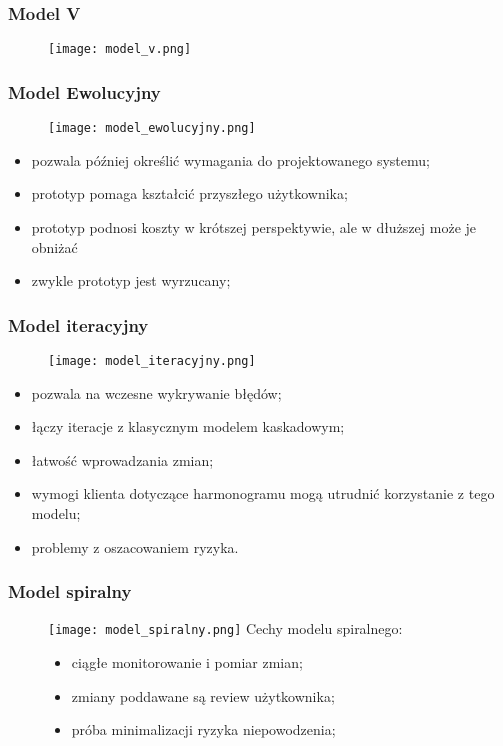 \documentclass[a4paper]{article}
\begin{document}
\subsubsection{Model V}
\begin{figure}[!h]
    \texttt{[image: model\_v.png]}
\end{figure}

\subsubsection{Model Ewolucyjny}
\begin{figure}[!h]
    \texttt{[image: model\_ewolucyjny.png]}
\end{figure}
    \begin{itemize}
        \item pozwala później określić wymagania do projektowanego
systemu;
        \item prototyp pomaga kształcić przyszłego użytkownika;
        \item prototyp podnosi koszty w krótszej perspektywie, ale w
dłuższej może je obniżać
        \item zwykle prototyp jest wyrzucany;
    \end{itemize}

\subsubsection{Model iteracyjny}
\begin{figure}[!h]
    \texttt{[image: model\_iteracyjny.png]}
\end{figure}
    \begin{itemize}
        \item pozwala na wczesne wykrywanie błędów;
        \item łączy iteracje z klasycznym modelem kaskadowym;
        \item łatwość wprowadzania zmian;
        \item wymogi klienta dotyczące harmonogramu mogą utrudnić korzystanie z tego
         modelu;
        \item problemy z oszacowaniem ryzyka.
    \end{itemize}

\subsubsection{Model spiralny}
\begin{figure}[!h]
    \texttt{[image: model\_spiralny.png]}
    Cechy modelu spiralnego:
    \begin{itemize}
        \item ciągłe monitorowanie i pomiar zmian;
        \item zmiany poddawane są review użytkownika;
        \item próba minimalizacji ryzyka niepowodzenia;
    \end{itemize}
\end{figure}
\end{document}
